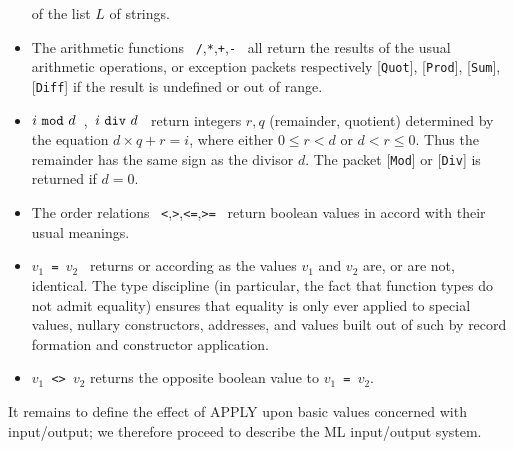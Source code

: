 \begin{itemize}
      of the list $L$ of strings.
\item The arithmetic functions ~\verb+/+,\verb+*+,\verb-+-,\verb+-+~ all
      return the results of the usual
      arithmetic operations, or exception packets respectively
      [{\tt Quot}], [{\tt Prod}], [{\tt Sum}], [{\tt Diff}]
      if the result is undefined or out of range.
\item $i\ {\tt mod}\ d$~,~$i\ {\tt div}\ d$~ return integers $r,q$
      (remainder, quotient) determined by the equation $d\times q +r=i$,
      where either $0\leq r<d$ or $d<r\leq 0$.  Thus the remainder has the
      same sign as the divisor $d$. The packet [{\tt Mod}] or
      [{\tt Div}] is returned if $d=0$.
\item The order relations ~\verb+<+,\verb+>+,\verb+<=+,\verb+>=+~ return
      boolean values in accord with their usual meanings.
\item $v_1$\verb+ = +$v_2$~ returns {\TRUE} or {\FALSE} according as
      the values $v_1$ and $v_2$ are, or are not, identical.
      The type discipline (in particular, the fact that function types
      do not admit equality) ensures that equality is only ever applied
      to special values, nullary constructors, addresses, and values
      built out of such by record formation and constructor application.
\item $v_1$\verb+ <> +$v_2$ returns the opposite boolean value to
      $v_1$\verb+ = +$v_2$.
\end{itemize}
It remains to define the effect of APPLY upon basic values concerned with
input/output; we therefore proceed to describe the ML input/output system.
 
